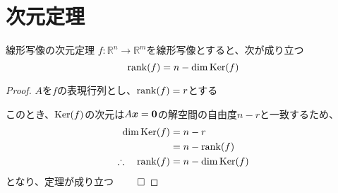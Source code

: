 \documentclass[../../../topic_linear-algebra]{subfiles}
\begin{document}
\sectionline
\section{次元定理}

\begin{theorem}{線形写像の次元定理}
  $f\colon \mathbb{R}^n \to \mathbb{R}^m$を線形写像とすると、次が成り立つ
  \begin{equation*}
    \rank(f) = n - \dim \operatorname{Ker}(f)
  \end{equation*}
\end{theorem}

\begin{proof}
  $A$を$f$の表現行列とし、$\rank(f) = r$とする

  このとき、$\operatorname{Ker}(f)$の次元は$A\vb*{x} = \vb*{0}$の解空間の自由度$n - r$と一致するため、
  \begin{align*}
    \dim \operatorname{Ker}(f)              & = n - r            \\
                              & = n - \rank(f)     \\
    \therefore \quad \rank(f) & = n - \dim \operatorname{Ker}(f)
  \end{align*}
  となり、定理が成り立つ $\qed$
\end{proof}
\end{document}

